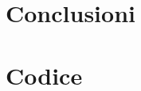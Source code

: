 \documentclass[11pt,a4paper]{article} %
\begin{document}
{%
%	

\section{Conclusioni}
	
	
\section{Codice}
} 	%

	
	
\end{document}
